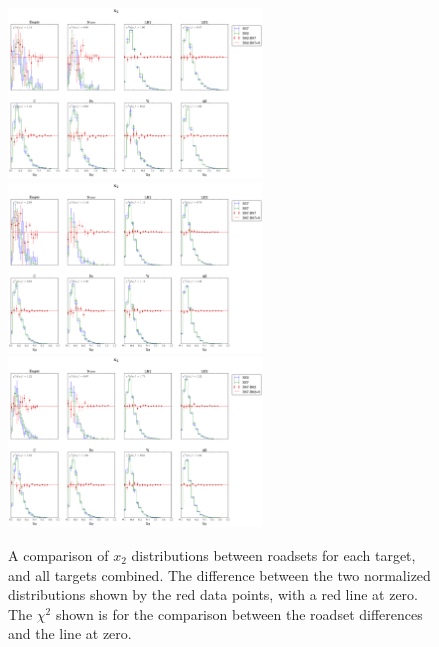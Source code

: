 \begin{figure}
	\centering
	\includegraphics[width=0.6\textwidth]{figures/analysis/R57_R62_compare_xT.png}\vspace{5pt} \\
	\includegraphics[width=0.6\textwidth]{figures/analysis/R57_R67_compare_xT.png} \vspace{5pt} \\
	\includegraphics[width=0.6\textwidth]{figures/analysis/R62_R67_compare_xT.png}
	\caption{A comparison of $x_2$ distributions between roadsets for each target, and all targets combined. The difference between the two normalized distributions shown by the red data points, with a red line at zero. The $\chi^2$ shown is for the comparison between the roadset differences and the line at zero.}
	\label{fig:roadset-x2-compare}
\end{figure}

